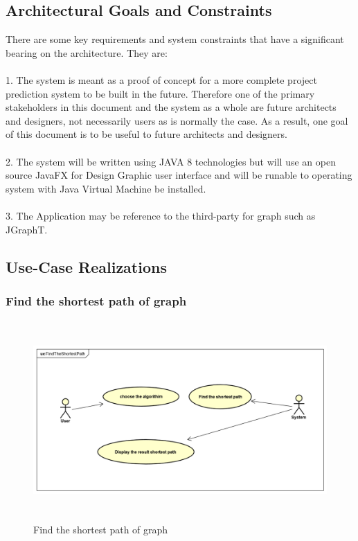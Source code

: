 \documentclass[a4paper,10pt]{article}
\begin{document}
\subsection{Architectural Goals and Constraints}
There are some key requirements and system constraints that have a significant bearing on the architecture.  They are:
\paragraph{}
1.	The system is meant as a proof of concept for a more complete project prediction system to be built in the future.  Therefore one of the primary stakeholders in this document and the system as a whole are future architects and designers, not necessarily users as is normally the case.  As a result, one goal of this document is to be useful to future architects and designers.
\paragraph{}
2.	The system will be written using JAVA 8 technologies but will use an open source JavaFX for Design Graphic user interface and will be runable to operating system with Java Virtual Machine be installed.
\paragraph{}
3.	The Application may be reference to the third-party for graph such as JGraphT.


\subsection{Use-Case Realizations}
\subsubsection{Find the shortest path of graph}
\begin{figure}[H]
		\centering
		\includegraphics[height = 3in]{usecase_findshortestpath.png}
		\caption[Optional caption]{Find the shortest path of graph}
		\label{fig:usecase_findshortestpath}
	\end{figure}
	
\end{document}
